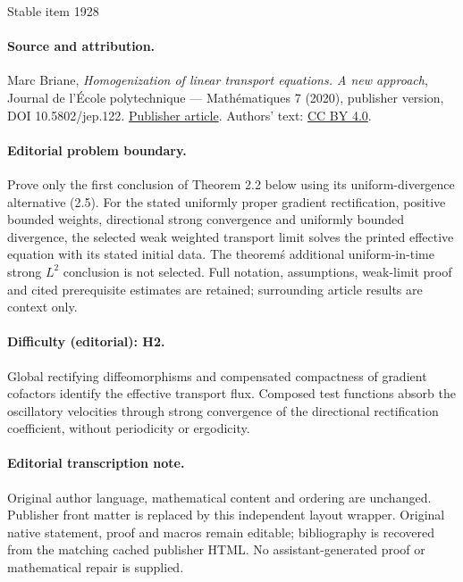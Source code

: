 \documentclass[11pt]{article}
\theoremstyle{plain}
\theoremstyle{definition}
\numberwithin{equation}{section}
\begin{document}
\begin{center}{\Large Stable item 1928}\end{center}
\paragraph{Source and attribution.}
Marc Briane, \emph{Homogenization of linear transport equations. A new approach}, Journal de l’École polytechnique — Mathématiques 7 (2020), publisher version, DOI 10.5802/jep.122. \href{https://jep.centre-mersenne.org/articles/10.5802/jep.122/}{Publisher article}. Authors' text: \href{https://creativecommons.org/licenses/by/4.0/}{CC BY 4.0}.
\paragraph{Editorial problem boundary.}
Prove only the first conclusion of Theorem 2.2 below using its uniform-divergence alternative (2.5). For the stated uniformly proper gradient rectification, positive bounded weights, directional strong convergence and uniformly bounded divergence, the selected weak weighted transport limit solves the printed effective equation with its stated initial data. The theorem\'s additional uniform-in-time strong \(L^2\) conclusion is not selected. Full notation, assumptions, weak-limit proof and cited prerequisite estimates are retained; surrounding article results are context only.
\paragraph{Difficulty (editorial): H2.}
Global rectifying diffeomorphisms and compensated compactness of gradient cofactors identify the effective transport flux. Composed test functions absorb the oscillatory velocities through strong convergence of the directional rectification coefficient, without periodicity or ergodicity.
\paragraph{Editorial transcription note.}
Original author language, mathematical content and ordering are unchanged. Publisher front matter is replaced by this independent layout wrapper. Original native statement, proof and macros remain editable; bibliography is recovered from the matching cached publisher HTML. No assistant-generated proof or mathematical repair is supplied.
\clearpage

\end{document}
